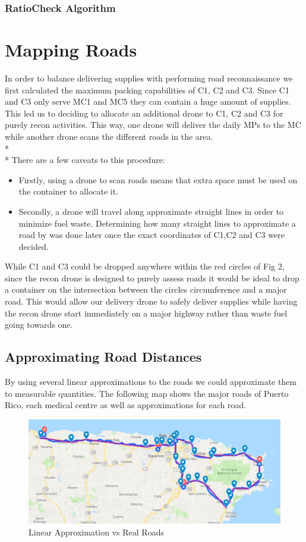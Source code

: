 \documentclass[a4paper,12pt]{article}
\begin{document}
\subsubsection{RatioCheck Algorithm}

\newpage

\section{Mapping Roads}
In order to balance delivering supplies with performing road reconnaissance we first calculated the maximum packing capabilities of C1, C2 and C3.
Since C1 and C3 only serve MC1 and MC5 they can contain a huge amount of supplies. This led us to deciding to allocate an additional drone to C1, C2 and C3 for purely recon activities.
This way, one drone will deliver the daily MPs to the MC while another drone scans the different roads in the area.\\*\\*
There are a few caveats to this procedure:
\begin{itemize}
\item Firstly, using a drone to scan roads means that extra space must be used on the container to allocate it.
\item Secondly, a drone will travel along approximate straight lines in order to minimize fuel waste. Determining how many straight lines to approximate a road by was done later once the exact coordinates of C1,C2 and C3 were decided.
\end{itemize}

While C1 and C3 could be dropped anywhere within the red circles of Fig 2, since the recon drone is designed to purely assess roads it would be ideal to drop a container on the intersection between the circles circumference and a major road.
This would allow our delivery drone to safely deliver supplies while having the recon drone start immediately on a major highway rather than waste fuel going towards one.

\subsection{Approximating Road Distances}
By using several linear approximations to the roads we could approximate them to measurable quantities. The following map shows the major roads of Puerto Rico, each medical centre as well as approximations for each road.

\begin{figure}[h]
\centering
\includegraphics[scale =0.5]{ConnectedLineMap}
\caption{Linear Approximation vs Real Roads}
\label{road-approx}
\end{figure}
\end{document}
